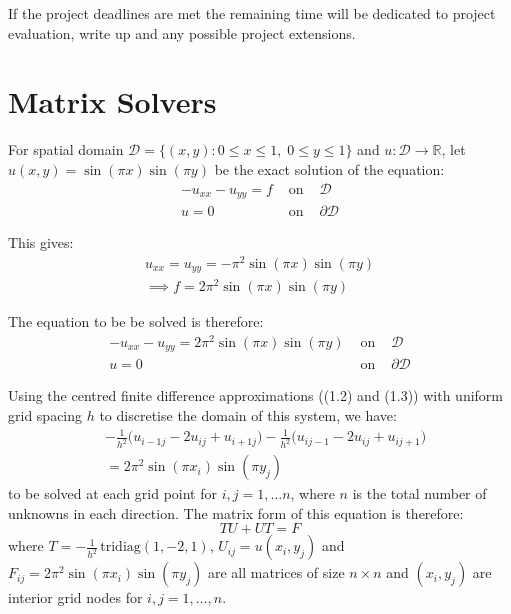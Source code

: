 \documentclass{article}
\numberwithin{equation}{section}
\begin{document}
If the project deadlines are met the remaining time will be dedicated to project evaluation, write up and any possible project extensions.

\newpage

\section{Matrix Solvers}
For spatial domain $\mathcal{D} = \{(x,y) : 0 \leq x \leq 1, \; 0 \leq y \leq 1 \}$ and $u: \mathcal{D} \rightarrow \mathbb{R}$, let $u(x,y) = \sin{(\pi x)} \sin{(\pi y)}$ be the exact solution of the equation:
\begin{eqnarray}
-u_{xx} -u_{yy} = f & \text{ on } & \mathcal{D} \nonumber \\
u = 0 & \text{ on } & \partial \mathcal{D}
\end{eqnarray}

This gives:
\begin{eqnarray} 
u_{xx} = u_{yy} = - \pi^2 \sin{(\pi x)} \sin{(\pi y)} \nonumber \\
\implies f = 2 \pi^2 \sin{(\pi x)} \sin {(\pi y)}
\end{eqnarray}

The equation to be be solved is therefore:
\begin{eqnarray}
-u_{xx} -u_{yy} = 2 \pi^2 \sin{(\pi x)} \sin {(\pi y)} & \text{ on } & \mathcal{D} \nonumber \\
u = 0 & \text{ on } & \partial \mathcal{D}
\end{eqnarray}

Using the centred finite difference approximations ((1.2) and (1.3)) with uniform grid spacing $h$ to discretise the domain of this system, we have:
	\begin{eqnarray}
	& -\frac{1}{h^2} \big( u_{i-1j} - 2u_{ij} + u_{i+1j} \big) - \frac{1}{h^2} \big( u_{ij-1} - 2u_{ij} + u_{ij+1} \big) \nonumber \\ & = 2\pi^2 \sin(\pi x_i) \sin(\pi y_j)
	\end{eqnarray}
to be solved at each grid point for $i, j = 1, \dots n$, where $n$ is the total number of unknowns in each direction. The matrix form of this equation is therefore:
\begin{equation}
	TU + UT = F
	\end{equation}
where $T=-\frac{1}{h^2} \, \text{tridiag}(1,-2,1)$, $U_{ij} = u(x_i, y_j)$ and $F_{ij} = 2 \pi^2 \sin(\pi x_i) \sin(\pi y_j)$ are all matrices of size $n \times n$ and $(x_i, y_j)$ are interior grid nodes for $i,j=1,\dots,n$.
\end{document}

